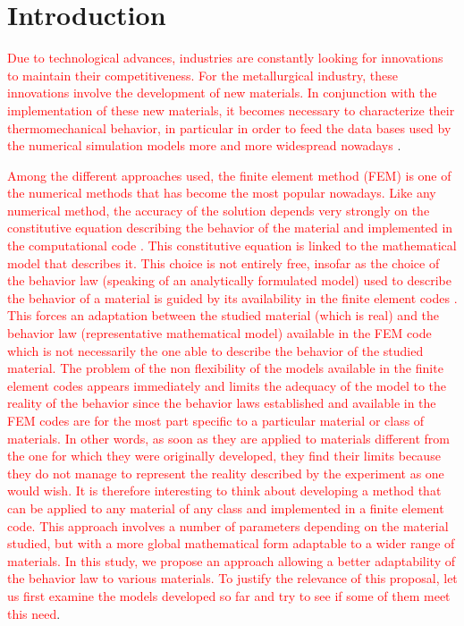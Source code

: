 \documentclass[twoside,english,1p,final,sort&compress]{elsarticle}
\theoremstyle{plain}
\begin{document}
\linenumbers

\section{Introduction\label{sec:Introduction}}
\textcolor{red}{Due to technological advances, industries are constantly looking for innovations to maintain their competitiveness. For the metallurgical industry, these innovations involve the development of new materials. In conjunction with the implementation of these new materials, it becomes necessary to characterize their thermomechanical behavior, in particular in order to feed the data bases used by the numerical simulation models more and more widespread nowadays \cite{Trimble-2020-Finite, Yuan-2021-Particle}}.

\textcolor{red}{Among the different approaches used, the finite element method (FEM) is one of the numerical methods that has become the most popular nowadays. Like any numerical method, the accuracy of the solution depends very strongly on the constitutive equation describing the behavior of the material and implemented in the computational code \cite{Li-2021-Finite, Liu-2021-Finite}. This constitutive equation is linked to the mathematical model that describes it. This choice is not entirely free, insofar as the choice of the behavior law (speaking of an analytically formulated model) used to describe the behavior of a material is guided by its availability in the finite element codes \cite{Miller-2021-Thermomechanical}. This forces an adaptation between the studied material (which is real) and the behavior law (representative mathematical model) available in the FEM code which is not necessarily the one able to describe the behavior of the studied material. The problem of the non flexibility of the models available in the finite element codes appears immediately and limits the adequacy of the model to the reality of the behavior since the behavior laws established and available in the FEM codes are for the most part specific to a particular material or class of materials. In other words, as soon as they are applied to materials different from the one for which they were originally developed, they find their limits because they do not manage to represent the reality described by the experiment as one would wish. It is therefore interesting to think about developing a method that can be applied to any material of any class and implemented in a finite element code. This approach involves a number of parameters depending on the material studied, but with a more global mathematical form adaptable to a wider range of materials. In this study, we propose an approach allowing a better adaptability of the behavior law to various materials. To justify the relevance of this proposal, let us first examine the models developed so far and try to see if some of them meet this need}.
\end{document}
